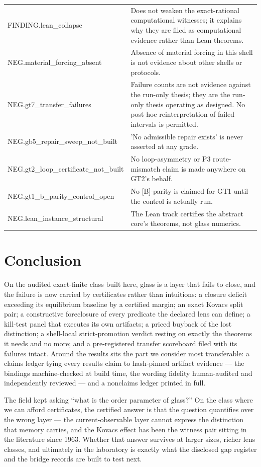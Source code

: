 \documentclass[11pt]{article}
\theoremstyle{definition}
\begin{document}
\begin{longtable}{lp{9cm}}
FINDING.lean\_collapse & Does not weaken the exact-rational computational witnesses; it explains why they are filed as computational evidence rather than Lean theorems. \\
NEG.material\_forcing\_absent & Absence of material forcing in this shell is not evidence about other shells or protocols. \\
NEG.gt7\_transfer\_failures & Failure counts are not evidence against the run-only thesis; they are the run-only thesis operating as designed. No post-hoc reinterpretation of failed intervals is permitted. \\
NEG.gb5\_repair\_sweep\_not\_built & 'No admissible repair exists' is never asserted at any grade. \\
NEG.gt2\_loop\_certificate\_not\_built & No loop-asymmetry or P3 route-mismatch claim is made anywhere on GT2's behalf. \\
NEG.gt1\_b\_parity\_control\_open & No [B]-parity is claimed for GT1 until the control is actually run. \\
NEG.lean\_instance\_structural & The Lean track certifies the abstract core's theorems, not glass numerics. \\
\bottomrule
\end{longtable}
  \section{Conclusion}
\label{sec:conclusion}


On the audited exact-finite class built here, glass is a layer that fails to close, and the
failure is now carried by certificates rather than intuitions: a closure deficit exceeding its
equilibrium baseline by a certified margin; an exact Kovacs split pair; a constructive foreclosure
of every predicate the declared lens can define; a kill-test panel that executes its own
artifacts; a priced buyback of the lost distinction; a shell-local strict-promotion verdict
resting on exactly the theorems it needs and no more; and a pre-registered transfer scoreboard
filed with its failures intact. Around the results sits the part we consider most transferable:
a claims ledger tying every results claim to hash-pinned artifact evidence --- the bindings
machine-checked at build time, the wording fidelity human-audited and independently reviewed ---
and a nonclaims ledger printed in full.

The field kept asking ``what is the order parameter of glass?'' On the class where we can afford
certificates, the certified answer is that the question quantifies over the wrong layer --- the
current-observable layer cannot express the distinction that memory carries, and the Kovacs
effect has been the witness pair sitting in the literature since 1963. Whether that answer
survives at larger sizes, richer lens classes, and ultimately in the laboratory is exactly what
the disclosed gap register and the bridge records are built to test next.
 

\clearpage


\end{document}
